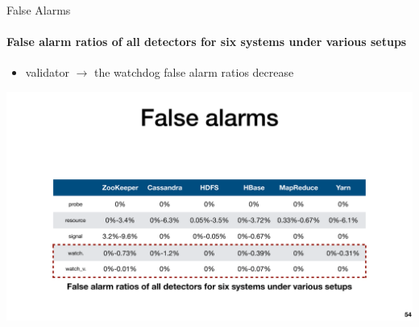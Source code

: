 \documentclass[aspectratio=169]{beamer}
\begin{document}
\begin{frame}{False Alarms}
    \framesubtitle{False alarm ratios of all detectors for six systems under various setups}
    \begin{itemize}
        \item validator $\to$ the watchdog false alarm ratios decrease
    \end{itemize}

    \begin{center}
        \includegraphics[width=\textwidth]{fig/false-alarm}
    \end{center}
\end{frame}
\end{document}

